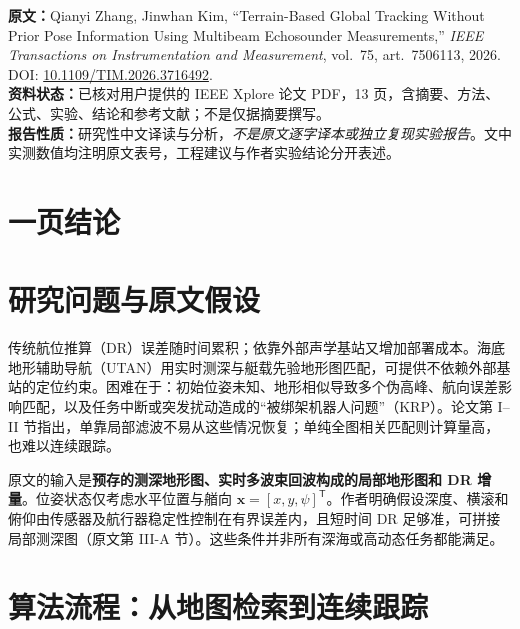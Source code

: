 \documentclass[11pt]{article}
\begin{document}

\noindent\textbf{原文：}Qianyi Zhang, Jinwhan Kim, ``Terrain-Based Global Tracking Without Prior Pose Information Using Multibeam Echosounder Measurements,'' \emph{IEEE Transactions on Instrumentation and Measurement}, vol.~75, art.~7506113, 2026. DOI: \href{https://doi.org/10.1109/TIM.2026.3716492}{10.1109/TIM.2026.3716492}.\\
\textbf{资料状态：}已核对用户提供的 IEEE Xplore 论文 PDF，13 页，含摘要、方法、公式、实验、结论和参考文献；不是仅据摘要撰写。\\
\textbf{报告性质：}研究性中文译读与分析，\emph{不是原文逐字译本或独立复现实验报告}。文中实测数值均注明原文表号，工程建议与作者实验结论分开表述。

\section*{一页结论}

\section{研究问题与原文假设}

传统航位推算（DR）误差随时间累积；依靠外部声学基站又增加部署成本。海底地形辅助导航（UTAN）用实时测深与艇载先验地形图匹配，可提供不依赖外部基站的定位约束。困难在于：初始位姿未知、地形相似导致多个伪高峰、航向误差影响匹配，以及任务中断或突发扰动造成的“被绑架机器人问题”（KRP）。论文第 I--II 节指出，单靠局部滤波不易从这些情况恢复；单纯全图相关匹配则计算量高，也难以连续跟踪。

原文的输入是\textbf{预存的测深地形图、实时多波束回波构成的局部地形图和 DR 增量}。位姿状态仅考虑水平位置与艏向 $\mathbf{x}=[x,y,\psi]^\mathsf{T}$。作者明确假设深度、横滚和俯仰由传感器及航行器稳定性控制在有界误差内，且短时间 DR 足够准，可拼接局部测深图（原文第 III-A 节）。这些条件并非所有深海或高动态任务都能满足。

\section{算法流程：从地图检索到连续跟踪}
\end{document}
